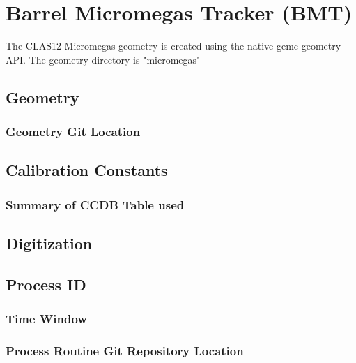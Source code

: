 \section{Barrel Micromegas Tracker (BMT)}

The CLAS12 Micromegas geometry is created using the native gemc geometry API.
The geometry directory is "micromegas"

\subsection{Geometry}

\subsubsection{Geometry Git Location}

\subsection{Calibration Constants}

\subsubsection{Summary of CCDB Table used}

\subsection{Digitization}

\subsection{Process ID}

\subsubsection{Time Window}

\subsubsection{Process Routine Git Repository Location}


